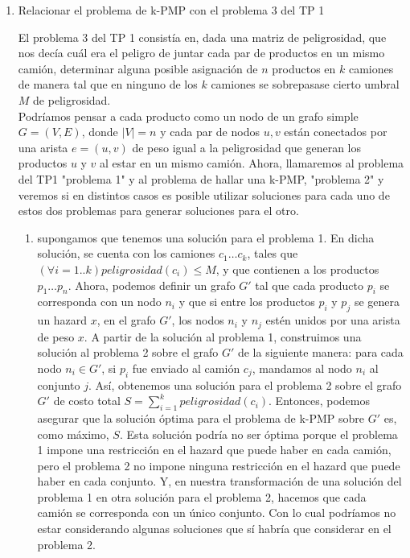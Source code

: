 \documentclass[11pt, a4paper, twoside]{article}
\begin{document}
		\begin{enumerate}
			 \item Relacionar el problema de k-PMP con el problema 3 del TP 1
			 
			  El problema 3 del TP 1 consistía en, dada una matriz de peligrosidad, que 
			  nos decía cuál era
			  el peligro de juntar cada par de productos en un mismo camión,  determinar alguna
			  posible asignación de $n$ productos en $k$ camiones de manera tal que en ninguno
			  de los $k$ camiones se sobrepasase cierto umbral $M$ de peligrosidad. \\
			  Podríamos pensar a cada producto como un nodo de un grafo simple $G = (V,E)$, donde 
			  $|V| = n$ y cada par de nodos $u,v$ están conectados por una arista $e = (u,v)$ de
			  peso igual a la peligrosidad que generan los productos $u$ y $v$ al estar en un
			  mismo camión. Ahora, llamaremos al problema del TP1 "problema 1" y al problema de hallar
			  una k-PMP, "problema 2" y veremos si en distintos casos es posible utilizar soluciones para cada uno 
			  de estos dos problemas para generar soluciones para el otro.
			  \begin{enumerate}
			      \item supongamos que tenemos una solución para el problema 1. En dicha solución, se
			      cuenta con los camiones $c_{1} \dots c_{k}$, tales que $(\forall i=1..k) 
			      peligrosidad(c_{i}) \leq M$, y que contienen a los productos $p_{1} \dots p_{n}$. 
			      Ahora, podemos definir un grafo $G'$ tal que cada producto $p_{i}$ se corresponda
			      con un nodo $n_{i}$ y que si entre los productos $p_{i}$ y $p_{j}$ se genera un hazard $x$, en 
			      el grafo $G'$, los nodos $n_{i}$ y $n_{j}$ estén unidos por una arista de peso $x$. A partir de 
			      la solución al problema 1, construimos una solución al problema 2 sobre el grafo $G'$ de la 
			      siguiente manera: para cada nodo $n_{i} \in G'$, si $p_{i}$ fue enviado al camión $c_{j}$, mandamos
			      al nodo $n_{i}$ al conjunto $j$. Así, obtenemos una solución para el problema 2 sobre el grafo
			      $G'$ de costo total $S = \sum\limits_{i=1}^k peligrosidad(c_{i})$. Entonces, podemos asegurar que
			      la solución óptima para el problema de k-PMP sobre $G'$ es, como máximo, $S$. Esta solución
			      podría no ser óptima porque el problema 1 impone una restricción en el hazard que puede 
			      haber en cada camión, pero el problema 2 no impone ninguna restricción en el hazard que puede haber
			      en cada conjunto. Y, en nuestra transformación de una solución del problema 1 en otra solución para
			      el problema 2, hacemos que cada camión se corresponda con un único conjunto. Con lo cual podríamos no estar
			      considerando algunas soluciones que sí habría que considerar en el problema 2.
			      

\end{enumerate}
\end{enumerate}
\end{document}
